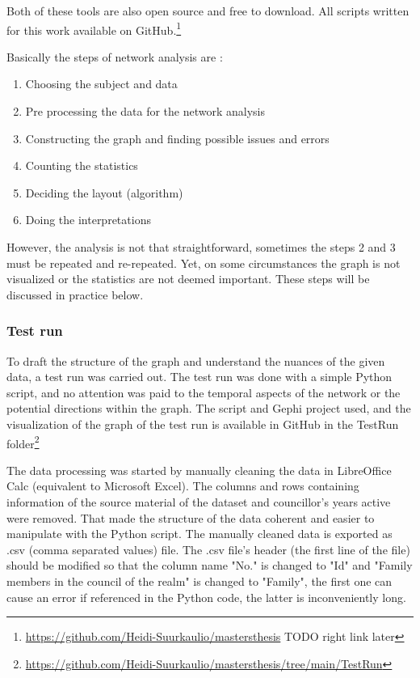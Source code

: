 Both of these tools are also open source and free to download. All scripts written for this work available on GitHub.\footnote{\url{https://github.com/Heidi-Suurkaulio/mastersthesis} TODO right link later}

Basically the steps of network analysis are : \begin{enumerate}
	\item Choosing the subject and data
	\item Pre processing the data for the network analysis
	\item Constructing the graph and finding possible issues and errors 
	\item Counting the statistics
	\item Deciding the layout (algorithm)
	\item Doing the interpretations
\end{enumerate}
However, the analysis is not that straightforward, sometimes the steps 2 and 3 must be repeated and re-repeated. Yet, on some circumstances the graph is not visualized or the statistics are not deemed important. These steps will be discussed in practice below.

\subsubsection{Test run}

To draft the structure of the graph and understand the nuances of the given data, a test run was carried out. The test run was done with a simple Python script, and no attention was paid to the temporal aspects of the network or the potential directions within the graph. The script and Gephi project used, and the visualization of the graph of the test run is available in GitHub in the TestRun folder\footnote{\url{https://github.com/Heidi-Suurkaulio/mastersthesis/tree/main/TestRun}}

The data processing was started by manually cleaning the data in LibreOffice Calc (equivalent to Microsoft Excel). The columns and rows containing information of the source material of the dataset and councillor's years active were removed. That made the structure of the data coherent and easier to manipulate with the Python script. The manually cleaned data is exported as .csv (comma separated values) file. The .csv file's header (the first line of the file) should be modified so that the column name "No." is changed to "Id" and "Family members in the council of the realm" is changed to "Family", the first one can cause an error if referenced in the Python code, the latter is inconveniently long.

